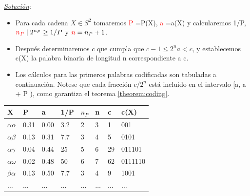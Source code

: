 \documentclass{beamer}
\theoremstyle{plain}
\theoremstyle{example}
\theoremstyle{example}
\begin{document}
\begin{frame}  \small 

\textit{\underline{Solución}}:\\ 
\begin{itemize}
\item Para cada cadena $X \in S^2$ tomaremos \textcolor{red}{P} =P(X), \textcolor{red}{a} =a(X) y calcularemos 1/P, $\textcolor{red}{n_P}  \; | \; 2^{n_P} \geq 1/P$  y $\textcolor{red}{n}=n_P + 1$. 
\item Después determinaremos $c$ que cumpla que $c-1\leq 2^n a<c$, y establecemos c(X) la palabra binaria de longitud n correspondiente a c. 
\item Los cálculos para las primeros palabras codificadas son tabuladas a continuación. Notese que cada fracción $c/2^n$ está incluido en el intervalo [a, a + P ), como garantiza el teorema \ref{theorem:coding}.

\end{itemize}




\begin{center}
 \begin{tabular}{| l | l | l | l | l | l | l | l|}\hline
        		 \textbf{X}             & \textbf{P}      &   \textbf{a}    & \textbf{1/P} & \textbf{$n_P$ }&\textbf{ n} & \textbf{c }  & \textbf{c(X)}\\\hline\hline
   $\alpha\alpha$    & 0.31 & 0.00 & 3.2   & 2       & 3 & 1   & 001\\\hline
   $\alpha\beta$      & 0.13 & 0.31 & 7.7   & 3		 & 4 & 5   & 0101\\\hline
   $\alpha\gamma$ & 0.04 & 0.44 & 25    & 5		 & 6 & 29 & 011101\\\hline
   $\alpha\omega$  & 0.02 & 0.48 & 50    & 6      & 7 & 62 & 0111110\\\hline
   $\beta\alpha$     & 0.13 & 0.50 & 7.7    & 3      & 4 & 9   & 1001\\\hline
   $\ldots$              &  $\ldots$  &  $\ldots$  &  $\ldots$   &  $\ldots$ &  $\ldots$  &  $\ldots$  & $\ldots$ \\
 \end{tabular}
\end{center}



\end{frame} 
\end{document}

